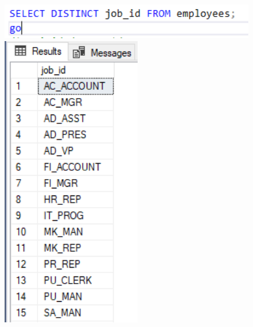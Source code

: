 \begin{enumerate}[1.]
	\begin{center}
	\includegraphics[width=11cm]{./Imagenes/actividad_02_03a} 
	\includegraphics[width=6cm]{./Imagenes/actividad_02_03} 
	\end{center}

\end{enumerate}


